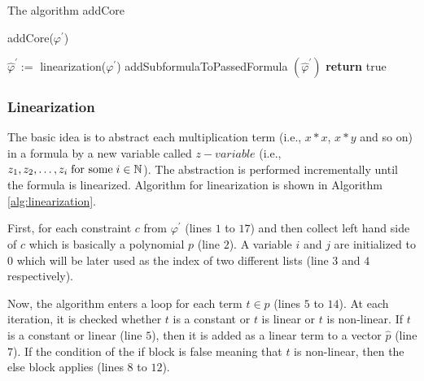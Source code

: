 \begin{algorithm}
\caption{The algorithm addCore} 
\label{alg:addcore}
addCore($\varphi^\prime$)
\begin{algorithmic}[1]
\State $\hat{\varphi}^\prime :=$ linearization($\varphi^\prime$)
\State addSubformulaToPassedFormula $( \hat{\varphi}^\prime )$
\State \textbf{return} true
\end{algorithmic}
\end{algorithm}
\subsubsection{Linearization}
\label{subsubsec:Linearization}
\noindent The basic idea is to abstract each multiplication term (i.e., $x \ast x$, $x \ast y$ and so on) in a formula by a new variable called $z-variable$ (i.e., $z_1, z_2,\dots, z_i \hspace{1mm}\text{for some}\hspace{1mm} i \in \mathbb{N}$).
The abstraction is performed incrementally until the formula is linearized.
Algorithm for linearization is shown in Algorithm \ref{alg:linearization}.\newline

\noindent First, for each constraint $c$ from $\varphi^\prime$ (lines $1$ to $17$) and then collect left hand side of $c$ which is basically a polynomial $p$ (line $2$).
A variable $i$ and $j$ are initialized to $0$ which will be later used as the index of two different lists (line $3$ and $4$ respectively).\newline

\noindent Now, the algorithm enters a loop for each term $t \in p$ (lines $5$ to $14$).
At each iteration, it is checked whether $t$ is a constant or $t$ is linear or $t$ is non-linear.
If $t$ is a constant or linear (line $5$), then it is added as a linear term to a vector $\hat{p}$ (line $7$).
If the condition of the if block is false meaning that $t$ is non-linear, then the else block applies (lines $8$ to $12$).\newline

